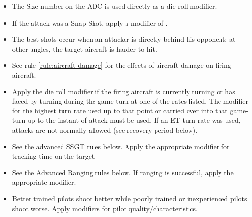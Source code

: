 \begin{itemize}

    \item{} 
    The Size number on the ADC is used directly as a die roll modifier.

    \item{} 
    If the attack was a Snap Shot, apply a modifier of .

    \item{}
    The best shots occur when an attacker is directly behind his opponent; at other angles, the target aircraft is harder to hit. 


    \item{} 
    See rule \ref{rule:aircraft-damage} for the effects of aircraft damage on firing aircraft.

    \item
     Apply the die roll modifier if the firing aircraft is currently turning or has faced by turning during the game-turn at one of the rates listed. The modifier for the highest turn rate used up to that point or carried over into that game-turn up to the instant of attack must be used. If an ET turn rate was used, attacks are not normally allowed (see recovery period below).

    \item{} 
    See the advanced SSGT rules below. Apply the appropriate modifier for tracking time on the target.

    \item{} 
    See the Advanced Ranging rules below. If ranging is successful, apply the appropriate modifier.

    \item{} Better trained pilots shoot better while poorly trained or inexperienced pilots shoot worse. Apply modifiers for pilot quality/characteristics.

\end{itemize}

